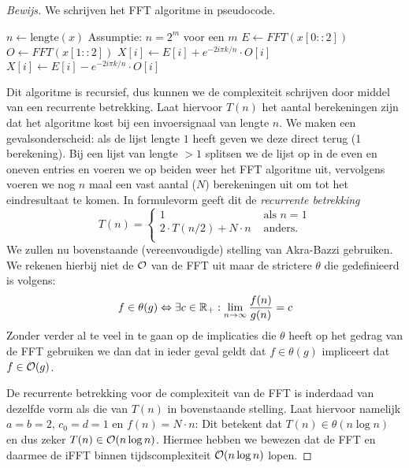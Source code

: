\begin{proof}[Bewijs]
We schrijven het FFT algoritme in pseudocode.

\begin{algorithmic}
\State $n \gets \text{lengte}(x)$ \Comment Assumptie: $n = 2^m$ voor een $m$
\Else
	\State $E \gets FFT(x[0::2])$ 
	\State $O \gets FFT(x[1::2])$ 
			\State $X[i] \gets E[i] + e^{-2i \pi k/n} \cdot O[i]$
		\Else
			\State $X[i] \gets E[i] - e^{-2i \pi k/n} \cdot O[i]$
		\EndIf
	\EndFor
\EndIf
\State {}
\EndFunction
\end{algorithmic}

Dit algoritme is recursief, dus kunnen we de complexiteit schrijven door middel van een recurrente betrekking. Laat hiervoor $T(n)$ het aantal berekeningen zijn dat het algoritme kost bij een invoersignaal van lengte $n$. We maken een gevalsonderscheid: als de lijst lengte $1$ heeft geven we deze direct terug (1 berekening). Bij een lijst van lengte $>1$ splitsen we de lijst op in de even en oneven entries en voeren we op beiden weer het FFT algoritme uit, vervolgens voeren we nog $n$ maal een vast aantal ($N$) berekeningen uit om tot het eindresultaat te komen. In formulevorm geeft dit de \emph{recurrente betrekking}
\[
T(n) = \begin{cases}
    1 &\text{ als } n = 1 \\
    2\cdot T(n/2) + N\cdot n &\text{ anders}. \\
\end{cases}
\]
We zullen nu bovenstaande (vereenvoudigde) stelling van Akra-Bazzi gebruiken. We rekenen hierbij niet de $\mathcal{O}$ van de FFT uit maar de strictere $\theta$ die gedefinieerd is volgens:
\[
f \in \theta(g) \Leftrightarrow \exists c \in \mathbb{R}_+: \lim_{n \to \infty} \frac{f(n)}{g(n)} = c
\]
Zonder verder al te veel in te gaan op de implicaties die $\theta$ heeft op het gedrag van de FFT gebruiken we dan dat in ieder geval geldt dat $f \in \theta(g)$ impliceert dat $f \in \mathcal{O}(g)$. 

De recurrente betrekking voor de complexiteit van de FFT is inderdaad van dezelfde vorm als die van $T(n)$ in bovenstaande stelling.
Laat hiervoor namelijk $a=b=2$, $c_0=d=1$ en $f (n) = N\cdot n$:
Dit betekent dat $T(n) \in \theta(n \log n)$ en dus zeker $T(n) \in \mathcal{O}(n \log n)$.
Hiermee hebben we bewezen dat de FFT en daarmee de iFFT binnen tijdscomplexiteit $\mathcal{O}(n\log n)$ lopen. 
\end{proof}


